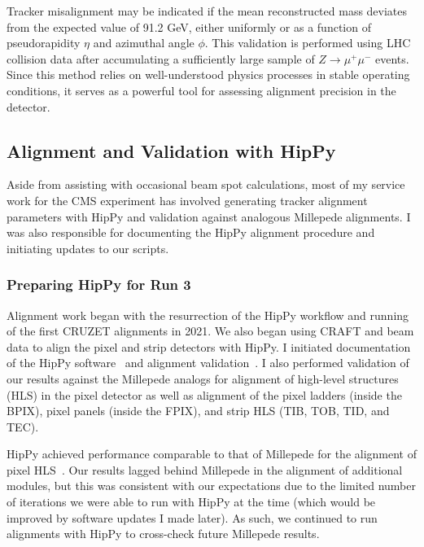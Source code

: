 Tracker misalignment may be indicated if the mean reconstructed mass deviates from the expected value of 91.2 GeV, either uniformly or as a function of pseudorapidity \( \eta \) and azimuthal angle \( \phi \). This validation is performed using LHC collision data after accumulating a sufficiently large sample of \( Z \to \mu^+\mu^- \) events. Since this method relies on well-understood physics processes in stable operating conditions, it serves as a powerful tool for assessing alignment precision in the detector.

\subsection{Alignment and Validation with HipPy}

Aside from assisting with occasional beam spot calculations, most of my service work for the CMS experiment has involved generating tracker alignment parameters with HipPy and validation against analogous Millepede alignments. I was also responsible for documenting the HipPy alignment procedure and initiating updates to our scripts. 

\subsubsection{Preparing HipPy for Run 3}

Alignment work began with the resurrection of the HipPy workflow and running of the first CRUZET alignments in 2021. We also began using CRAFT and beam data to align the pixel and strip detectors with HipPy. I initiated documentation of the HipPy software~\cite{SWGuideH90:online} and alignment validation~\cite{Alignmen77:online}. I also performed validation of our results against the Millepede analogs for alignment of high-level structures (HLS) in the pixel detector as well as alignment of the pixel ladders (inside the BPIX), pixel panels (inside the FPIX), and strip HLS (TIB, TOB, TID, and TEC). 

HipPy achieved performance comparable to that of Millepede for the alignment of pixel HLS~\cite{WeeklyTr72:online, WeeklyTr25:online}. Our results lagged behind Millepede in the alignment of additional modules, but this was consistent with our expectations due to the limited number of iterations we were able to run with HipPy at the time (which would be improved by software updates I made later). As such, we continued to run alignments with HipPy to cross-check future Millepede results. 

